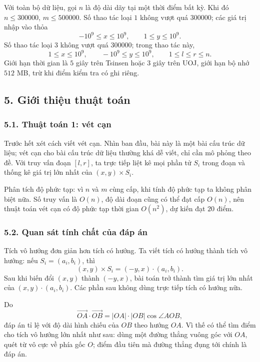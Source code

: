 \documentclass[11pt]{article}
\begin{document}
Với toàn bộ dữ liệu, gọi \(n\) là độ dài dãy tại một thời điểm bất kỳ. Khi đó
\(n\le 300000\), \(m\le 500000\). Số thao tác loại \(1\) không vượt quá
\(300000\); các giá trị nhập vào thỏa
\[
  -10^9\le x\le 10^9,\qquad 1\le y\le 10^9.
\]
Số thao tác loại \(3\) không vượt quá \(300000\); trong thao tác này,
\[
  1\le x\le 10^9,\qquad -10^9\le y\le 10^9,\qquad 1\le l\le r\le n.
\]
Giới hạn thời gian là \(5\) giây trên Tsinsen hoặc \(3\) giây trên UOJ, giới
hạn bộ nhớ \(512\) MB, trừ khi điểm kiểm tra có ghi riêng.

\subsection*{5. Giới thiệu thuật toán}

\subsubsection*{5.1. Thuật toán 1: vét cạn}

Trước hết xét cách viết vét cạn. Nhìn ban đầu, bài này là một bài cấu trúc dữ
liệu; vét cạn cho bài cấu trúc dữ liệu thường khá dễ viết, chỉ cần mô phỏng
theo đề. Với truy vấn đoạn \([l,r]\), ta trực tiếp liệt kê mọi phần tử
\(S_i\) trong đoạn và thống kê giá trị lớn nhất của \((x,y)\times S_i\).

Phân tích độ phức tạp: vì \(n\) và \(m\) cùng cấp, khi tính độ phức tạp ta
không phân biệt nữa. Số truy vấn là \(O(n)\), độ dài đoạn cũng có thể đạt cấp
\(O(n)\), nên thuật toán vét cạn có độ phức tạp thời gian \(O(n^2)\), dự kiến
đạt \(20\) điểm.

\subsubsection*{5.2. Quan sát tính chất của đáp án}

Tích vô hướng đơn giản hơn tích có hướng. Ta viết tích có hướng thành tích vô
hướng: nếu \(S_i=(a_i,b_i)\), thì
\[
  (x,y)\times S_i=(-y,x)\cdot(a_i,b_i).
\]
Sau khi biến đổi \((x,y)\) thành \((-y,x)\), bài toán trở thành tìm giá trị
lớn nhất của \((x,y)\cdot(a_i,b_i)\). Các phần sau không dùng trực tiếp tích
có hướng nữa.

Do
\[
  \overrightarrow{OA}\cdot\overrightarrow{OB}
  =|OA|\cdot|OB|\cos\angle AOB,
\]
đáp án tỉ lệ với độ dài hình chiếu của \(OB\) theo hướng \(OA\). Vì thế có
thể tìm điểm cho tích vô hướng lớn nhất như sau: dùng một đường thẳng vuông
góc với \(OA\), quét từ vô cực về phía gốc \(O\); điểm đầu tiên mà đường thẳng
đụng tới chính là đáp án.
\end{document}
